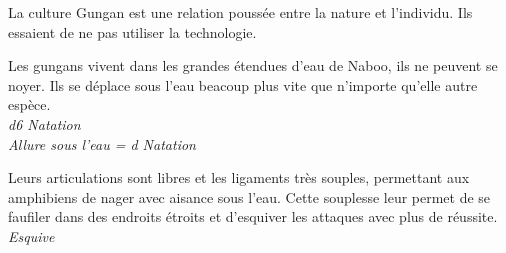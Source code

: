 La culture Gungan est une relation poussée entre la nature et l'individu. Ils essaient de ne pas utiliser la technologie.

\begin{description}[align=left]
\item [Aquatique] 			%
		Les gungans vivent dans les grandes étendues d'eau de Naboo, ils ne peuvent se noyer. Ils se déplace sous l'eau beacoup plus vite que n'importe qu'elle autre espèce.\\
		\emph{d6 Natation}\\
		\emph{Allure sous l'eau = d Natation}
\item [Mollusque] 			%
		Leurs articulations sont libres et les ligaments très souples, permettant aux amphibiens de nager avec aisance sous l'eau. Cette souplesse leur permet de se faufiler dans des endroits étroits et d'esquiver les attaques avec plus de réussite.\\
		\emph{Esquive}
\end{description}